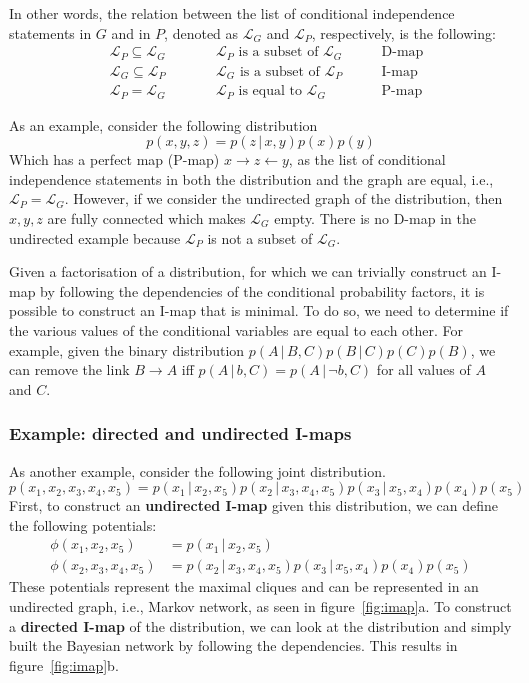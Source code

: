 \documentclass{article}
\newcommand{\giv}{\,|\,}
\begin{document}
\noindent In other words, the relation between the list of conditional independence statements in $G$ and in $P$, denoted as $\mathcal{L}_G$ and $\mathcal{L}_P$, respectively, is the following:
\begin{align*}
    &\mathcal{L}_P \subseteq \mathcal{L}_G \qquad &&\mathcal{L}_P \text{ is a subset of } \mathcal{L}_G \qquad &\text{D-map}\\
    &\mathcal{L}_G \subseteq \mathcal{L}_P \qquad &&\mathcal{L}_G \text{ is a subset of } \mathcal{L}_P \qquad &\text{I-map}\\
    &\mathcal{L}_P = \mathcal{L}_G \qquad &&\mathcal{L}_P \text{ is equal to } \mathcal{L}_G \qquad &\text{P-map}
\end{align*}

\noindent As an example, consider the following distribution
$$
    p(x, y, z) = p(z \giv x, y)p(x)p(y)
$$
Which has a perfect map (P-map) $x \rightarrow z \leftarrow y$, as the list of conditional independence statements in both the distribution and the graph are equal, i.e., $\mathcal{L}_P = \mathcal{L}_G$. However, if we consider the undirected graph of the distribution, then $x, y, z$ are fully connected which makes $\mathcal{L}_G$ empty. There is no D-map in the undirected example because $\mathcal{L}_P$ is not a subset of $\mathcal{L}_G$. 

Given a factorisation of a distribution, for which we can trivially construct an I-map by following the dependencies of the conditional probability factors, it is possible to construct an I-map that is minimal. To do so, we need to determine if the various values of the conditional variables are equal to each other. For example, given the binary distribution $p(A \giv B, C) p(B \giv C) p(C) p(B)$, we can remove the link $B \rightarrow A$ iff $p(A \giv b, C) = p(A \giv \neg b, C)$ for all values of $A$ and $C$. 

\subsubsection{Example: directed and undirected I-maps}

\noindent As another example, consider the following joint distribution.
$$
    p(x_1, x_2, x_3, x_4, x_5) = p(x_1 \giv x_2, x_5) p(x_2 \giv x_3, x_4, x_5) p(x_3 \giv x_5, x_4) p(x_4) p(x_5)
$$
\noindent First, to construct an \textbf{undirected I-map} given this distribution, we can define the following potentials:
\begin{align*}
    \phi(x_1, x_2, x_5) &= p(x_1 \giv x_2, x_5) \\
    \phi(x_2, x_3, x_4, x_5) &= p(x_2 \giv x_3, x_4, x_5) p(x_3 \giv x_5, x_4) p(x_4) p(x_5)  
\end{align*}
\noindent These potentials represent the maximal cliques and can be represented in an undirected graph, i.e., Markov network, as seen in figure~\ref{fig:imap}a. To construct a \textbf{directed I-map} of the distribution, we can look at the distribution and simply built the Bayesian network by following the dependencies. This results in figure~\ref{fig:imap}b. 
\end{document}
